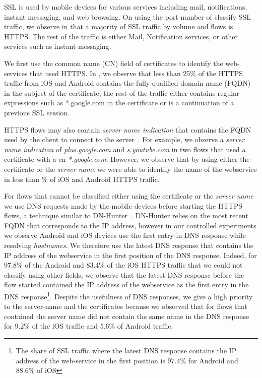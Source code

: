 SSL is used by mobile devices for various services including mail, notifications, instant messaging, and web browsing.
On using the port number of classify SSL traffic,  we observe in  that a majority of SSL traffic by volume and flows is HTTPS.
The rest of the traffic is either Mail, Notification services, or other services such as instant messaging.

We first use the common name (CN) field of certificates to identify the web-services that used HTTPS.
In , we observe that less than 25\% of the HTTPS traffic from iOS and Android contains the fully qualified domain name (FQDN) in the subject of the certificate; the rest of the traffic either contains regular expressions such as *.google.com in the certificate or is a continuation of a previous SSL session. 

HTTPS flows may also contain \emph{server name indication} that contains the FQDN used by the client to connect to the server~\cite{rfc:servernametls}.
For example, we observe a \emph{server name indication} of \emph{plus.google.com} and \emph{s.youtube.com} in two flows that used a certificate with a cn \emph{*.google.com}.
However, we observe that by using either the certificate or the \emph{server name} we were able to identify the name of the webservice in less than \% of iOS and Android HTTPS traffic.

For flows that cannot be classified either using the certificate or the \emph{server name} we use DNS requests made by the mobile devices before starting the HTTPS flows, a technique similar to DN-Hunter~\cite{bermudez:dnhunter}.
DN-Hunter relies on the most recent FQDN that corresponds to the IP address, however in our controlled experiments we observe Android and iOS devices use the first entry in DNS response while resolving \emph{hostnames}.
We therefore use the latest DNS response that contains the IP address of the webservice in the first position of the DNS response. 
Indeed, for 97.8\% of the Android and 83.4\% of the iOS HTTPS traffic that we could not classify using other fields, we observe that the latest DNS response before the flow started contained the IP address of the webservice as the first entry in the DNS response\footnote{The share of SSL traffic where the latest DNS response contains the IP address of the web-service in the first position is 97.4\% for Android and 88.6\% of iOS}. 
Despite the usefulness of DNS responses, we give a high priority to the server-name and the certificates because we observed that for flows that contained the server name did not contain the same name in the DNS response for 9.2\% of the iOS traffic and 5.6\% of Android traffic.


